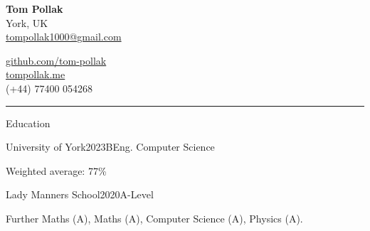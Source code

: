 \documentclass{structure}
\begin{document}
\parbox{0.5\textwidth}{ 
{\namesize\bf{Tom Pollak}} \\[6pt]
York, UK\\ 
\href{mailto:tompollak1000@gmail.com}{tompollak1000@gmail.com}
}
\hfill 
\parbox{0.5\textwidth}{ 
\vspace*{10pt}

\begin{flushright}

\href{https://github.com/tom-pollak}{github.com/tom-pollak} \\
\href{https://tompollak.me}{tompollak.me} \\
(+44) 77400 054268
\end{flushright}

}

\smallskip
\hrule
\smallskip

\begin{rSection}{Education}

\begin{rSubsection}{University of York}{2023}{BEng. Computer Science}{}{}
    \item Weighted average: 77\% 
\end{rSubsection}

\begin{rSubsection}{Lady Manners School}{2020}{A-Level}{}{}
    \item Further Maths (A), Maths (A), Computer Science (A), Physics (A).
\end{rSubsection}
\end{rSection}

\end{document}
